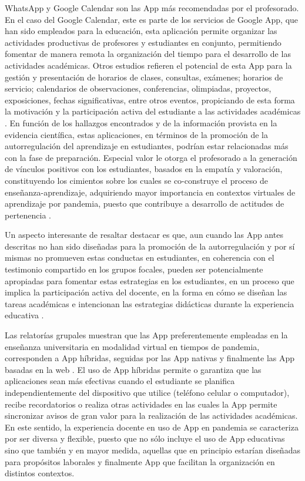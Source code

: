 \documentclass[spanish]{textolivre}
\begin{document}
WhatsApp y Google Calendar son las App más recomendadas por el profesorado. En el caso del Google Calendar, este es parte de los servicios de Google App, que han sido empleados para la educación, esta aplicación permite organizar las actividades productivas de profesores y estudiantes en conjunto, permitiendo fomentar de manera remota la organización del tiempo para el desarrollo de las actividades académicas. Otros estudios refieren el potencial de esta App para la gestión y presentación de horarios de clases, consultas, exámenes; horarios de servicio; calendarios de observaciones, conferencias, olimpiadas, proyectos, exposiciones, fechas significativas, entre otros eventos, propiciando de esta forma la motivación y la participación activa del estudiante a las actividades académicas \cite{samerkhanova_developing_2017, amiruddin2020}. En función de los hallazgos encontrados y de la información provista en la evidencia científica, estas aplicaciones, en términos de la promoción de la autorregulación del aprendizaje en  estudiantes, podrían estar relacionadas más con la fase de preparación. Especial valor  le otorga el profesorado a la generación de vínculos positivos con los  estudiantes, basados en la empatía y valoración, constituyendo los cimientos sobre los cuales se co-construye el proceso de enseñanza-aprendizaje, adquiriendo mayor  importancia en contextos virtuales de aprendizaje por pandemia, puesto que contribuye a desarrollo de actitudes de pertenencia \cite{macfarlane2018}. 

Un aspecto interesante de resaltar  destacar es que, aun cuando las App antes descritas no han sido diseñadas para la promoción de la autorregulación y  por sí mismas no promueven estas conductas en estudiantes, en coherencia con el testimonio compartido en los grupos focales, pueden ser potencialmente apropiadas para fomentar estas estrategias en los  estudiantes, en un proceso que implica la participación activa del docente, en la forma en cómo  se diseñan las tareas académicas e intencionan las estrategias didácticas durante la experiencia educativa \cite{valencia2017, weepiu2020, martinez-sarmiento2018, castro2016}.

Las relatorías grupales muestran que las App preferentemente empleadas en la enseñanza universitaria en modalidad virtual en tiempos de pandemia, corresponden a App híbridas, seguidas por las  App nativas y finalmente las App basadas en la web \cite[p. 12-13]{santiago_mobile_2015}. El uso de App híbridas permite o garantiza que las aplicaciones sean más efectivas cuando el estudiante se planifica independientemente del dispositivo que utilice (teléfono celular o computador), recibe recordatorios o realiza otras actividades en las cuales la App permite sincronizar  avisos de gran valor para la realización de las actividades académicas. En este sentido, la experiencia docente en uso de App en pandemia se caracteriza por ser  diversa y flexible, puesto que  no sólo incluye el uso de App educativas sino que también y  en mayor medida, aquellas que en principio estarían diseñadas para propósitos laborales  y finalmente App que facilitan la organización en distintos contextos. 
\end{document}
